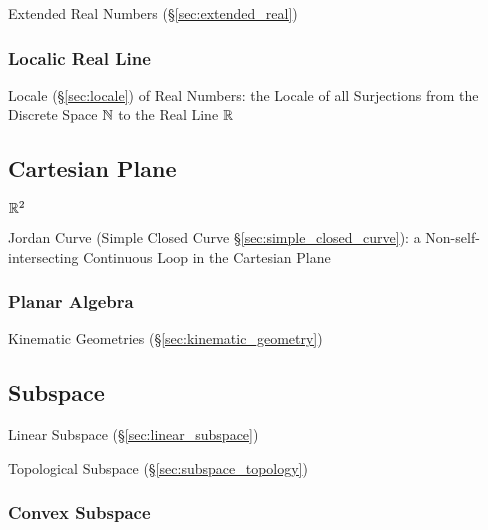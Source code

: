 Extended Real Numbers (\S\ref{sec:extended_real})




\subsubsection{Localic Real Line}\label{sec:localic_real_line}

Locale (\S\ref{sec:locale}) of Real Numbers: the Locale of all Surjections from
the Discrete Space $\mathbb{N}$ to the Real Line $\mathbb{R}$



\subsection{Cartesian Plane}\label{sec:cartesian_plane}

$\mathbb{R}^2$

Jordan Curve (Simple Closed Curve \S\ref{sec:simple_closed_curve}): a
Non-self-intersecting Continuous Loop in the Cartesian Plane



\subsubsection{Planar Algebra}\label{sec:planar_algebra}

Kinematic Geometries (\S\ref{sec:kinematic_geometry})



\subsection{Subspace}\label{sec:subspace}


\fist Linear Subspace (\S\ref{sec:linear_subspace})

\fist Topological Subspace (\S\ref{sec:subspace_topology})



\subsubsection{Convex Subspace}\label{sec:convex_subspace}

